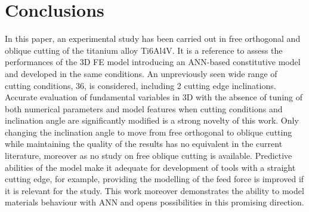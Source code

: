 \documentclass[preprint,12pt,times]{elsarticle}
\begin{document}
\section{Conclusions}

In this paper, an experimental study has been carried out in free orthogonal and oblique cutting of the titanium alloy Ti6Al4V. It is a reference to assess the performances of the 3D FE model introducing an ANN-based constitutive model and developed in the same conditions. An unpreviously seen wide range of cutting conditions, 36, is considered, including 2 cutting edge inclinations. Accurate evaluation of fundamental variables in 3D with the absence of tuning of both numerical parameters and model features when cutting conditions and inclination angle are significantly modified is a strong novelty of this work. Only changing the inclination angle to move from free orthogonal to oblique cutting while maintaining the quality of the results has no equivalent in the current literature, moreover as no study on free oblique cutting is available. Predictive abilities of the model make it adequate for development of tools with a straight cutting edge, for example, providing the modelling of the feed force is improved if it is relevant for the study. This work moreover demonstrates the ability to model materials behaviour with ANN and opens possibilities in this promising direction.

%
%


%
%
%
%


%
%
%

\appendix
%
\end{document}
